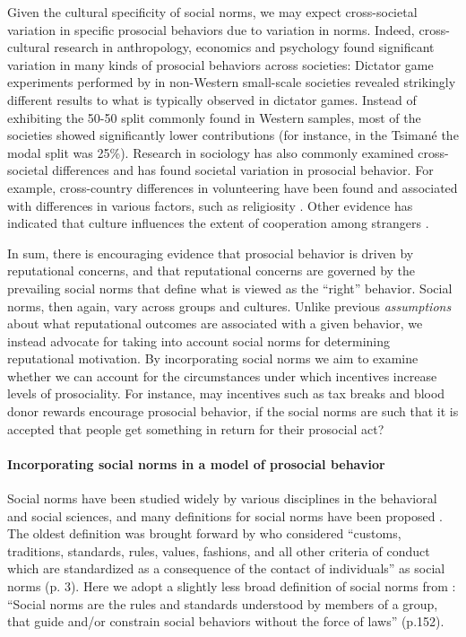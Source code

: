 \documentclass[AER]{AEA}
\begin{document}
Given the cultural specificity of social norms, we may expect cross-societal variation in specific prosocial behaviors due to variation in norms. Indeed, cross-cultural research in anthropology, economics and psychology found significant variation in many kinds of prosocial behaviors across societies: Dictator game experiments performed by \cite{henrich_search_2001} in non-Western small-scale societies revealed strikingly different results to what is typically observed in dictator games. Instead of exhibiting the 50-50 split commonly found in Western samples, most of the societies showed significantly lower contributions (for instance, in the Tsimané the modal split was 25\%). Research in sociology has also commonly examined cross-societal differences and has found societal variation in prosocial behavior. For example, cross-country differences in volunteering have been found and associated with differences in various factors, such as religiosity \citep{ruiter_national_2006}.
Other evidence has indicated that culture influences the extent of cooperation among strangers \cite[see e.g., experimental evidence from 16 subject pools from six different world cultures presented in][]{gachter_culture_2010}.

In sum, there is encouraging evidence that prosocial behavior is driven by reputational concerns, and that reputational concerns are governed by the prevailing social norms that define what is viewed as the “right” behavior. Social norms, then again, vary across groups and cultures. Unlike previous \textit{assumptions} about what reputational outcomes are associated with a given behavior, we instead advocate for taking into account social norms for determining reputational motivation. By incorporating social norms we aim to examine whether we can account for the circumstances under which incentives increase levels of prosociality. For instance, may incentives such as tax breaks and blood donor rewards encourage prosocial behavior, if the social norms are such that it is accepted that people get something in return for their prosocial act?

\paragraph{Incorporating social norms in a model of prosocial behavior}

Social norms have been studied widely by various disciplines in the behavioral and social sciences, and many definitions for social norms have been proposed \citep{wallen_social_2017}. The oldest definition was brought forward by \cite{sherif_psychology_1936} who considered “customs, traditions, standards, rules, values, fashions, and all other criteria of conduct which are standardized as a consequence of the contact of individuals” as social norms (p. 3). Here we adopt a slightly less broad definition of social norms from \cite{cialdini_social_1998}: “Social norms are the rules and standards understood by members of a group, that guide and/or constrain social behaviors without the force of laws” (p.152).
\end{document}
